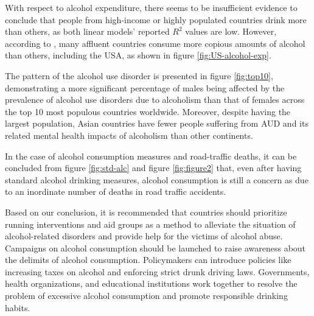 \documentclass[11pt,a4paper,]{article}
\begin{document}
With respect to alcohol expenditure, there seems to be insufficient evidence to conclude that people from high-income or highly populated countries drink more than others, as both linear models' reported \(R^2\) values are low. However, according to \textcite{owidalcoholconsumption}, many affluent countries consume more copious amounts of alcohol than others, including the USA, as shown in figure \ref{fig:US-alcohol-exp}.

The pattern of the alcohol use disorder is presented in figure \ref{fig:top10}, demonstrating a more significant percentage of males being affected by the prevalence of alcohol use disorders due to alcoholism than that of females across the top 10 most populous countries worldwide. Moreover, despite having the largest population, Asian countries have fewer people suffering from AUD and its related mental health impacts of alcoholism than other continents.

In the case of alcohol consumption measures and road-traffic deaths, it can be concluded from figure \ref{fig:std-alc} and figure \ref{fig:figure2} that, even after having standard alcohol drinking measures, alcohol consumption is still a concern as due to an inordinate number of deaths in road traffic accidents.

Based on our conclusion, it is recommended that countries should prioritize running interventions and aid groups as a method to alleviate the situation of alcohol-related disorders and provide help for the victims of alcohol abuse. Campaigns on alcohol consumption should be launched to raise awareness about the delimits of alcohol consumption. Policymakers can introduce policies like increasing taxes on alcohol and enforcing strict drunk driving laws. Governments, health organizations, and educational institutions work together to resolve the problem of excessive alcohol consumption and promote responsible drinking habits.

\printbibliography
\end{document}
